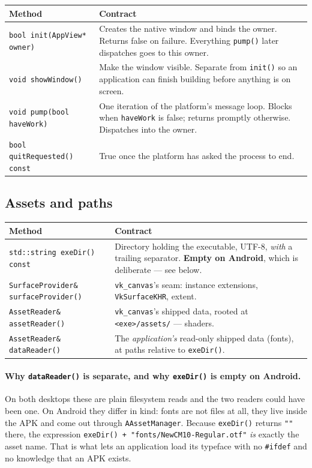 \documentclass[11pt,a4paper]{article}
\begin{document}
\begin{longtable}{@{}p{}p{}@{}}
\toprule
\textbf{Method} & \textbf{Contract} \\
\midrule
\endhead
\texttt{bool init(AppView* owner)} &
Creates the native window and binds the owner. Returns false on failure.
Everything \texttt{pump()} later dispatches goes to this owner. \\
\addlinespace
\texttt{void showWindow()} &
Make the window visible. Separate from \texttt{init()} so an application can
finish building before anything is on screen. \\
\addlinespace
\texttt{void pump(bool haveWork)} &
One iteration of the platform's message loop. Blocks when \texttt{haveWork} is
false; returns promptly otherwise. Dispatches into the owner. \\
\addlinespace
\texttt{bool quitRequested() const} &
True once the platform has asked the process to end. \\
\bottomrule
\end{longtable}

\subsection{Assets and paths}

\begin{longtable}{@{}p{}p{}@{}}
\toprule
\textbf{Method} & \textbf{Contract} \\
\midrule
\endhead
\texttt{std::string exeDir() const} &
Directory holding the executable, UTF-8, \emph{with} a trailing separator.
\textbf{Empty on Android}, which is deliberate --- see below. \\
\addlinespace
\texttt{SurfaceProvider\& surfaceProvider()} &
\texttt{vk\_canvas}'s seam: instance extensions, \texttt{VkSurfaceKHR}, extent. \\
\addlinespace
\texttt{AssetReader\& assetReader()} &
\texttt{vk\_canvas}'s shipped data, rooted at \texttt{<exe>/assets/} --- shaders. \\
\addlinespace
\texttt{AssetReader\& dataReader()} &
The \emph{application's} read-only shipped data (fonts), at paths relative to
\texttt{exeDir()}. \\
\bottomrule
\end{longtable}

\paragraph{Why \texttt{dataReader()} is separate, and why \texttt{exeDir()} is
empty on Android.} On both desktops these are plain filesystem reads and the two
readers could have been one. On Android they differ in kind: fonts are not files
at all, they live inside the APK and come out through \texttt{AAssetManager}.
Because \texttt{exeDir()} returns \texttt{""} there, the expression
\texttt{exeDir() + "fonts/NewCM10-Regular.otf"} \emph{is} exactly the asset
name. That is what lets an application load its typeface with no \texttt{\#ifdef}
and no knowledge that an APK exists.
\end{document}
